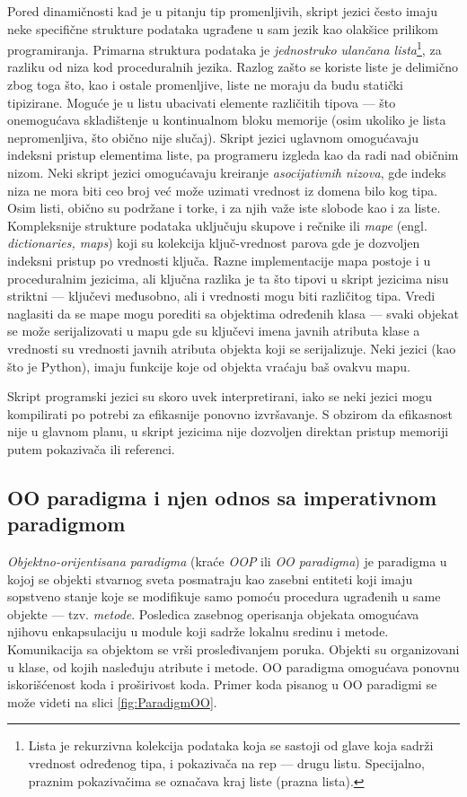 Pored dinamičnosti kad je u pitanju tip promenljivih, skript jezici često imaju neke specifične strukture podataka ugrađene u sam jezik kao olakšice prilikom programiranja. Primarna struktura podataka je \emph{jednostruko ulančana lista}\footnote{Lista je rekurzivna kolekcija podataka koja se sastoji od glave koja sadrži vrednost određenog tipa, i pokazivača na rep --- drugu listu. Specijalno, praznim pokazivačima se označava kraj liste (prazna lista).}, za razliku od niza kod proceduralnih jezika. Razlog zašto se koriste liste je delimično zbog toga što, kao i ostale promenljive, liste ne moraju da budu statički tipizirane. Moguće je u listu ubacivati elemente različitih tipova --- što onemogućava skladištenje u kontinualnom bloku memorije (osim ukoliko je lista nepromenljiva, što obično nije slučaj). Skript jezici uglavnom omogućavaju indeksni pristup elementima liste, pa programeru izgleda kao da radi nad običnim nizom. Neki skript jezici omogućavaju kreiranje \emph{asocijativnih nizova}, gde indeks niza ne mora biti ceo broj već može uzimati vrednost iz domena bilo kog tipa. Osim listi, obično su podržane i torke, i za njih važe iste slobode kao i za liste. Kompleksnije strukture podataka uključuju skupove i rečnike ili \emph{mape} (engl. \emph{dictionaries, maps}) koji su kolekcija ključ-vrednost parova gde je dozvoljen indeksni pristup po vrednosti ključa. Razne implementacije mapa postoje i u proceduralnim jezicima, ali ključna razlika je ta što tipovi u skript jezicima nisu striktni --- ključevi međusobno, ali i vrednosti mogu biti različitog tipa. Vredi naglasiti da se mape mogu porediti sa objektima određenih klasa --- svaki objekat se može serijalizovati u mapu gde su ključevi imena javnih atributa klase a vrednosti su vrednosti javnih atributa objekta koji se serijalizuje. Neki jezici (kao što je Python), imaju funkcije koje od objekta vraćaju baš ovakvu mapu. 

Skript programski jezici su skoro uvek interpretirani, iako se neki jezici mogu kompilirati po potrebi za efikasnije ponovno izvršavanje. S obzirom da efikasnost nije u glavnom planu, u skript jezicima nije dozvoljen direktan pristup memoriji putem pokazivača ili referenci. 


\subsection{OO paradigma i njen odnos sa imperativnom paradigmom}
\label{subsec:ParadigmsOther}

\emph{Objektno-orijentisana paradigma} (kraće \emph{OOP} ili \emph{OO paradigma}) je paradigma u kojoj se objekti stvarnog sveta posmatraju kao zasebni entiteti koji imaju sopstveno stanje koje se modifikuje samo pomoću procedura ugrađenih u same objekte --- tzv. \emph{metode}. Posledica zasebnog operisanja objekata omogućava njihovu enkapsulaciju u module koji sadrže lokalnu sredinu i metode. Komunikacija sa objektom se vrši prosleđivanjem poruka. Objekti su organizovani u klase, od kojih nasleđuju atribute i metode. OO paradigma omogućava ponovnu iskorišćenost koda i proširivost koda. Primer koda pisanog u OO paradigmi se može videti na slici \ref{fig:ParadigmOO}.

